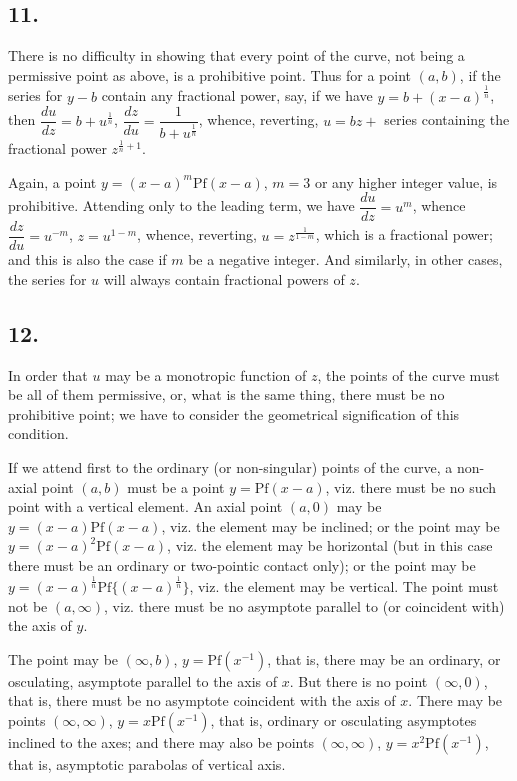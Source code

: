 \documentclass[11pt,a4paper]{book}
\providecommand{\Pf}{\mathrm{Pf}}
\begin{document}
\subsection*{11.}

There is no difficulty in showing that every point of the curve, not being a permissive point as above, is a prohibitive point. Thus for a point $(a, b)$, if the series for $y - b$ contain any fractional power, say, if we have $y = b + (x - a)^{\frac{1}{n}}$, then $\dfrac{du}{dz} = b + u^{\frac{1}{n}}$, $\dfrac{dz}{du} = \dfrac{1}{b + u^{\frac{1}{n}}}$, whence, reverting, $u = bz +$ series containing the fractional power $z^{\frac{1}{n} + 1}$.

Again, a point $y = (x - a)^m \Pf(x - a)$, $m = 3$ or any higher integer value, is prohibitive. Attending only to the leading term, we have $\dfrac{du}{dz} = u^m$, whence $\dfrac{dz}{du} = u^{-m}$, $z = u^{1-m}$, whence, reverting, $u = z^{\frac{1}{1-m}}$, which is a fractional power; and this is also the case if $m$ be a negative integer. And similarly, in other cases, the series for $u$ will always contain fractional powers of $z$.

\subsection*{12.}

In order that $u$ may be a monotropic function of $z$, the points of the curve must be all of them permissive, or, what is the same thing, there must be no prohibitive point; we have to consider the geometrical signification of this condition.

If we attend first to the ordinary (or non-singular) points of the curve, a non-axial point $(a, b)$ must be a point $y = \Pf(x - a)$, viz. there must be no such point with a vertical element. An axial point $(a, 0)$ may be $y = (x - a)\Pf(x - a)$, viz. the element may be inclined; or the point may be $y = (x - a)^2 \Pf(x - a)$, viz. the element may be horizontal (but in this case there must be an ordinary or two-pointic contact only); or the point may be $y = (x - a)^{\frac{1}{n}} \Pf\{(x - a)^{\frac{1}{n}}\}$, viz. the element may be vertical. The point must not be $(a, \infty)$, viz. there must be no asymptote parallel to (or coincident with) the axis of $y$.

The point may be $(\infty, b)$, $y = \Pf(x^{-1})$, that is, there may be an ordinary, or osculating, asymptote parallel to the axis of $x$. But there is no point $(\infty, 0)$, that is, there must be no asymptote coincident with the axis of $x$. There may be points $(\infty, \infty)$, $y = x\Pf(x^{-1})$, that is, ordinary or osculating asymptotes inclined to the axes; and there may also be points $(\infty, \infty)$, $y = x^2\Pf(x^{-1})$, that is, asymptotic parabolas of vertical axis.
\end{document}

